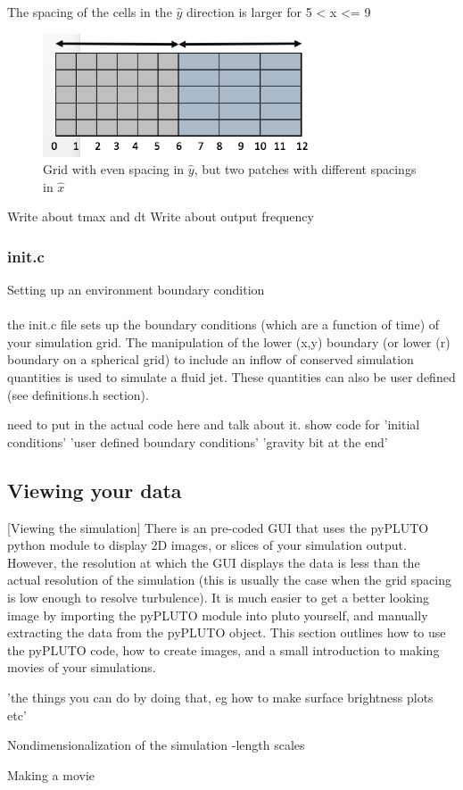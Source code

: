 \documentclass[12pt]{article}
\begin{document}
The spacing of the cells in the $\hat{y}$ direction is larger for 5 < x <= 9
\begin{figure}[h]
	\includegraphics[width=8cm]{gridspaces}
	\centering
	\caption{Grid with even spacing in $\hat{y}$, but two patches with different spacings in $\hat{x}$}
\end{figure}


Write about tmax and dt
Write about output frequency
\subsubsection{init.c}
Setting up an environment
boundary condition\\
\\
the init.c file sets up the boundary conditions (which are a function of time) of your simulation grid. The manipulation of the lower (x,y) boundary (or lower (r) boundary on a spherical grid) to include an inflow of conserved simulation quantities is used to simulate a fluid jet. These quantities can also be user defined (see definitions.h section).

need to put in the actual code here and talk about it. show code for
'initial conditions'
'user defined boundary conditions'
'gravity bit at the end'

\subsection{Viewing your data}
[Viewing the simulation]
There is an pre-coded GUI that uses the pyPLUTO python module to display 2D images, or slices of your simulation output. However, the resolution at which the GUI displays the data is less than the actual resolution of the simulation (this is usually the case when the grid spacing is low enough to resolve turbulence). It is much easier to get a better looking image by importing the pyPLUTO module into pluto yourself, and manually extracting the data from the pyPLUTO object. This section outlines how to use the pyPLUTO code, how to create images, and a small introduction to making movies of your simulations.

'the things you can do by doing that, eg how to make surface brightness plots etc'

Nondimensionalization of the simulation
-length scales

Making a movie
\end{document}
